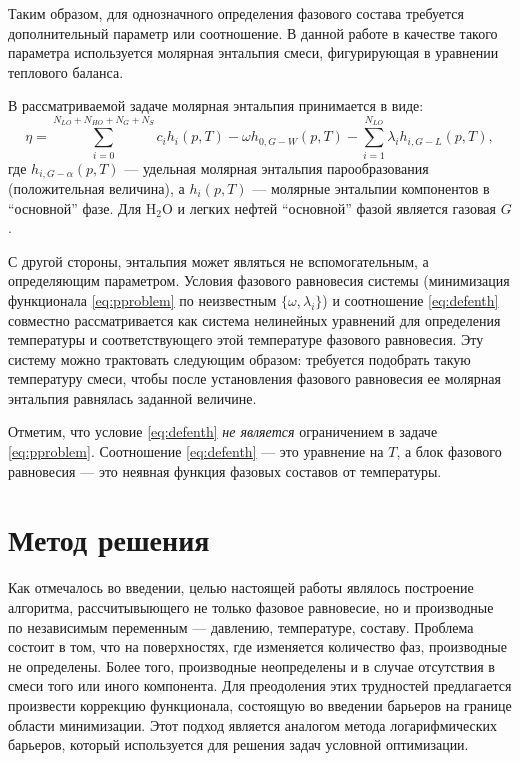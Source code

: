 \documentclass[12pt]{article}
\begin{document}
Таким образом, для однозначного определения фазового состава требуется дополнительный параметр или соотношение. В данной работе в качестве такого параметра используется молярная энтальпия смеси, фигурирующая в уравнении теплового баланса.

В рассматриваемой задаче молярная энтальпия принимается в виде:
\begin{equation}
\eta = \sum_{i=0}^{N_{LO}+N_{HO}+N_{G}+N_{S}} c_i h_i(p,T) -\omega h_{0,G-W}(p,T) -\sum_{i=1}^{N_{LO}} \lambda_i
h_{i,G-L}(p,T) , \label{eq:defenth}
\end{equation}
где $h_{i,G-\alpha}(p,T)$ --- удельная молярная энтальпия парообразования (положительная величина), а $h_i(p,T)$ --- молярные энтальпии компонентов в ``основной'' фазе. Для $\mathrm{H_2O}$ и легких нефтей ``основной'' фазой является газовая $G$.

С другой стороны, энтальпия может являться не вспомогательным, а определяющим параметром. Условия фазового равновесия системы (минимизация функционала \eqref{eq:pproblem} по неизвестным $\{\omega, \lambda_i\}$) и соотношение \eqref{eq:defenth} совместно рассматривается как система нелинейных уравнений для определения температуры и соответствующего этой температуре фазового равновесия. Эту систему можно трактовать следующим образом: требуется подобрать такую температуру смеси, чтобы после установления фазового равновесия ее молярная энтальпия равнялась заданной величине.

Отметим, что условие \eqref{eq:defenth} \emph{не является} ограничением в задаче \eqref{eq:pproblem}. Соотношение \eqref{eq:defenth} --- это уравнение на $T$, а блок фазового равновесия --- это неявная функция фазовых составов от температуры.


\section{Метод решения}

Как отмечалось во введении, целью настоящей работы являлось построение алгоритма, рассчитывыющего не только фазовое равновесие, но и производные по независимым переменным --- давлению, температуре, составу. Проблема состоит в том, что на поверхностях, где изменяется количество фаз, производные не определены. Более того, производные неопределены и в случае отсутствия в смеси того или иного компонента. Для преодоления этих трудностей предлагается произвести коррекцию функционала, состоящую во введении барьеров на границе области минимизации. Этот подход является аналогом метода логарифмических барьеров, который используется для решения задач условной оптимизации.
\end{document}
